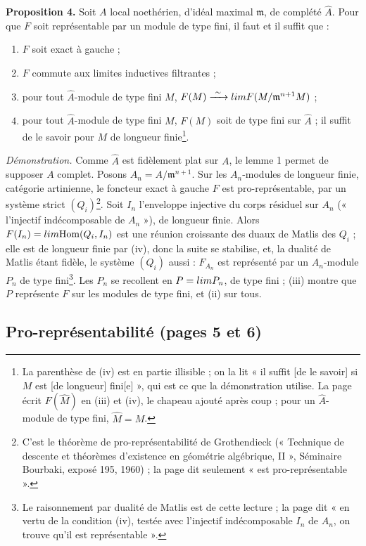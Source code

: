 \documentclass[11pt,a4paper]{article}
\begin{document}
\textbf{Proposition 4.} Soit $A$ local noethérien, d'idéal maximal
$\mathfrak{m}$, de complété $\widehat{A}$. Pour que $F$ soit représentable par
un module de type fini, il faut et il suffit que :
\begin{enumerate}
\item[(i)] $F$ soit exact à gauche ;
\item[(ii)] $F$ commute aux limites inductives filtrantes ;
\item[(iii)] pour tout $\widehat{A}$-module de type fini $M$,
$F(M) \xrightarrow{\ \sim\ } \varprojlim F(M/\mathfrak{m}^{n+1}M)$ ;
\item[(iv)] pour tout $\widehat{A}$-module de type fini $M$, $F(M)$ soit de
type fini sur $\widehat{A}$ ; il suffit de le savoir pour $M$ de longueur
finie\footnote{La parenthèse de (iv) est en partie illisible ; on la lit « il
suffit [de le savoir] si $M$ est [de longueur] fini[e] », qui est ce que la
démonstration utilise. La page écrit $F(\widehat{M})$ en (iii) et (iv), le
chapeau ajouté après coup ; pour un $\widehat{A}$-module de type fini,
$\widehat{M} = M$.}.
\end{enumerate}

\emph{Démonstration.} Comme $\widehat{A}$ est fidèlement plat sur $A$, le
lemme 1 permet de supposer $A$ complet. Posons $A_n = A/\mathfrak{m}^{n+1}$.
Sur les $A_n$-modules de longueur finie, catégorie artinienne, le foncteur
exact à gauche $F$ est pro-représentable, par un système strict
$(Q_i)$\footnote{C'est le théorème de pro-représentabilité de Grothendieck
(« Technique de descente et théorèmes d'existence en géométrie algébrique,
II », Séminaire Bourbaki, exposé 195, 1960) ; la page dit seulement « est
pro-représentable ».}. Soit $I_n$ l'enveloppe injective du corps résiduel sur
$A_n$ (« l'injectif indécomposable de $A_n$ »), de longueur finie. Alors
$F(I_n) = \varinjlim \mathrm{Hom}(Q_i, I_n)$ est une réunion croissante des
duaux de Matlis des $Q_i$ ; elle est de longueur finie par (iv), donc la suite
se stabilise, et, la dualité de Matlis étant fidèle, le système $(Q_i)$ aussi :
$F_{A_n}$ est représenté par un $A_n$-module $P_n$ de type fini\footnote{Le
raisonnement par dualité de Matlis est de cette lecture ; la page dit « en
vertu de la condition (iv), testée avec l'injectif indécomposable $I_n$ de
$A_n$, on trouve qu'il est représentable ».}. Les $P_n$ se recollent en
$P = \varprojlim P_n$, de type fini ; (iii) montre que $P$ représente $F$ sur
les modules de type fini, et (ii) sur tous.

\subsection*{Pro-représentabilité (pages 5 et 6)}
\end{document}
